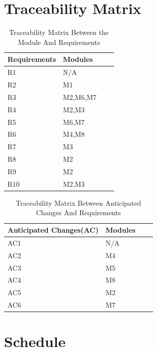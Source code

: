 \documentclass[11pt]{article}
\begin{document}
    \section{Traceability Matrix}
    \begin{table}[h]
    \caption{Traceability Matrix Between the Module And Requirements}
    \begin{tabular}{p{4cm}p{2cm}p{2cm}p{4cm}}
    Requirements & Modules\\
    \hline
    R1 & N/A\\
    \hline
    R2 & M1\\
    \hline
    R3 & M2,M6,M7\\
    \hline
    R4 & M2,M3\\
    \hline
    R5 & M6,M7\\
    \hline
    R6 & M4,M8\\
    \hline
    R7 & M3\\
    \hline
    R8 & M2\\
    \hline
    R9 & M2\\
    \hline
    R10 & M2,M3\\
    \hline
    \end{tabular}
    \end{table}
    
    \begin{table}[h]
    \caption{Traceability Matrix Between Anticipated Changes And Requirements}
    \begin{tabular}{p{4cm}p{2cm}p{2cm}p{4cm}}
    Anticipated Changes(AC) & Modules\\
    \hline
    AC1 & N/A\\
    \hline
    AC2 & M4\\
    \hline
    AC3 & M5\\
    \hline
    AC4 & M8\\
    \hline
    AC5 & M2\\
    \hline
    AC6 & M7\\
    \hline
    \end{tabular}
    \end{table}
    \newpage
    \section{Schedule}
        
    
\end{document}
